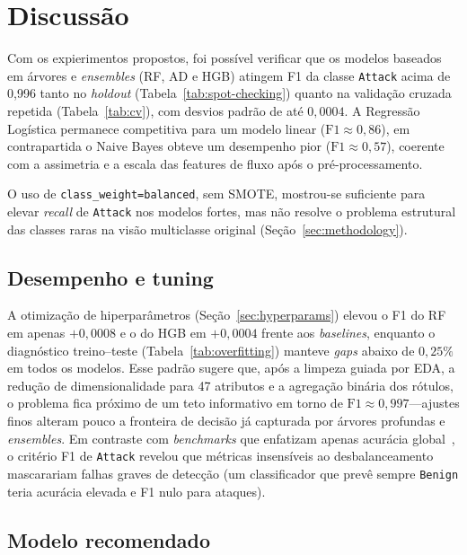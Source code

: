 \documentclass[12pt]{article}
\makeatletter
\newlength{\sbcblockmargin}
\newenvironment{sbcnarrowblock}{%
  \list{}{%
    \topsep\z@
    \partopsep\z@
    \itemsep\z@
    \parsep\z@
    \leftmargin=\sbcblockmargin
    \rightmargin=\sbcblockmargin
    \listparindent=\parindent
    \itemindent=\z@
    \labelwidth=\z@
    \labelsep=\z@
  }\item\relax}
{\endlist}
\makeatother
\begin{document}
\begin{sbcnarrowblock}
\section{Discussão}
\label{sec:discussion}

Com os expierimentos propostos, foi possível verificar que os modelos baseados em árvores e \textit{ensembles} (RF, AD e HGB) atingem F1 da classe \texttt{Attack} acima de 0,996 tanto no \textit{holdout} (Tabela~\ref{tab:spot-checking}) quanto na validação cruzada repetida (Tabela~\ref{tab:cv}), com desvios padrão de até $0{,}0004$.
A Regressão Logística permanece competitiva para um modelo linear ($\mathrm{F1} \approx 0{,}86$), em contrapartida o Naive Bayes obteve um desempenho pior ($\mathrm{F1} \approx 0{,}57$), coerente com a assimetria e a escala das features de fluxo após o pré-processamento.

O uso de \texttt{class\_weight=balanced}, sem SMOTE, mostrou-se suficiente para elevar \textit{recall} de \texttt{Attack} nos modelos fortes, mas não resolve o problema estrutural das classes raras na visão multiclasse original (Seção~\ref{sec:methodology}).

\subsection{Desempenho e tuning}
\label{sec:disc-performance}

A otimização de hiperparâmetros (Seção~\ref{sec:hyperparams}) elevou o F1 do RF em apenas $+0{,}0008$ e o do HGB em $+0{,}0004$ frente aos \textit{baselines}, enquanto o diagnóstico treino--teste (Tabela~\ref{tab:overfitting}) manteve \textit{gaps} abaixo de $0{,}25\%$ em todos os modelos.
Esse padrão sugere que, após a limpeza guiada por EDA, a redução de dimensionalidade para 47 atributos e a agregação binária dos rótulos, o problema fica próximo de um teto informativo em torno de $\mathrm{F1} \approx 0{,}997$---ajustes finos alteram pouco a fronteira de decisão já capturada por árvores profundas e \textit{ensembles}.
Em contraste com \textit{benchmarks} que enfatizam apenas acurácia global~\cite{maseer2021benchmarking}, o critério F1 de \texttt{Attack} revelou que métricas insensíveis ao desbalanceamento mascarariam falhas graves de detecção (um classificador que prevê sempre \texttt{Benign} teria acurácia elevada e F1 nulo para ataques).

\subsection{Modelo recomendado}
\label{sec:disc-model}


\end{sbcnarrowblock}
\end{document}

